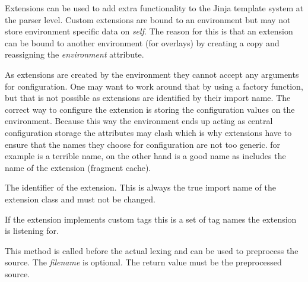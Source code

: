 \documentclass[a4paper,10pt,english]{sphinxmanual}
\begin{document}
\begin{fulllineitems}
\label{extensions:jinja2.ext.Extension}
Extensions can be used to add extra functionality to the Jinja template
system at the parser level.  Custom extensions are bound to an environment
but may not store environment specific data on \emph{self}.  The reason for
this is that an extension can be bound to another environment (for
overlays) by creating a copy and reassigning the \emph{environment} attribute.

As extensions are created by the environment they cannot accept any
arguments for configuration.  One may want to work around that by using
a factory function, but that is not possible as extensions are identified
by their import name.  The correct way to configure the extension is
storing the configuration values on the environment.  Because this way the
environment ends up acting as central configuration storage the
attributes may clash which is why extensions have to ensure that the names
they choose for configuration are not too generic.   for example
is a terrible name,  on the other hand is a good
name as includes the name of the extension (fragment cache).

\begin{fulllineitems}
\label{extensions:jinja2.ext.Extension.identifier}
The identifier of the extension.  This is always the true import name
of the extension class and must not be changed.

\end{fulllineitems}


\begin{fulllineitems}
\label{extensions:jinja2.ext.Extension.tags}
If the extension implements custom tags this is a set of tag names
the extension is listening for.

\end{fulllineitems}


\begin{fulllineitems}
\label{extensions:jinja2.ext.Extension.preprocess}
This method is called before the actual lexing and can be used to
preprocess the source.  The \emph{filename} is optional.  The return value
must be the preprocessed source.


\end{fulllineitems}
\end{fulllineitems}
\end{document}
